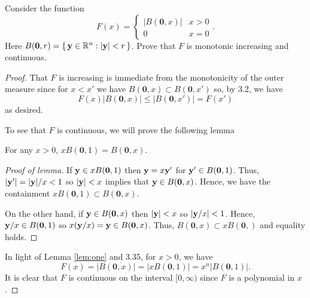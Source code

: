 \begin{problem}
Consider the function
\[
F(x)=
\begin{cases}
|B(\mathbf{0},x)|&x>0\\
0&x=0
\end{cases}.
\]
Here
$B(\mathbf{0},r)=\left\{\,\mathbf{y}\in\mathbb{R}^n:|\mathbf{y}|<r\,\right\}$. Prove
that $F$ is monotonic increasing and continuous.
\end{problem}
\begin{proof}
That $F$ is increasing is immediate from the monotonicity of the outer
measure since for $x<x'$ we have $B(\mathbf{0},x)\subset B(\mathbf{0},x')$
so, by 3.2, we have
\[
F(x)\left|B(\mathbf{0},x)\right|\leq\left|B(\mathbf{0},x')\right|=F(x')
\]
as desired.

To see that $F$ is continuous, we will prove the following lemma
\begin{lemma}
\label{lem:one}
For any $x>0$, $xB(\mathbf{0},1)=B(\mathbf{0},x)$.
\end{lemma}
\begin{proof}[Proof of lemma]
\renewcommand\qedsymbol{$\clubsuit$}
If $\mathbf{y}\in xB(\mathbf{0},1)$ then $\mathbf{y}=x\mathbf{y}'$ for $\mathbf{y}'\in
B(\mathbf{0},1)$. Thus, $|\mathbf{y}'|=|\mathbf{y}|/x<1$ so $|\mathbf{y}|<x$ implies that
$\mathbf{y}\in B(\mathbf{0},x)$. Hence, we have the containment
$xB(\mathbf{0},1)\subset B(\mathbf{0},x)$.

On the other hand, if $\mathbf{y}\in B(\mathbf{0},x)$ then $|\mathbf{y}|<x$ so
$\left|\mathbf{y}/x\right|<1$. Hence, $\mathbf{y}/x\in B(\mathbf{0},1)$ so
$x(\mathbf{y}/x)=\mathbf{y}\in B(\mathbf{0},x)$. Thus, $B(\mathbf{0},x)\subset
xB(\mathbf{0},)$ and equality holds.
\end{proof}
In light of Lemma \ref{lem:one} and 3.35, for $x>0$, we have
\begin{equation}
\label{eq:scale-map}
F(x)=\left|B(\mathbf{0},x)\right|
=\left|xB(\mathbf{0},1)\right|
=x^n\left|B(\mathbf{0},1)\right|.
\end{equation}
It is clear that $F$ is continuous on the interval $[0,\infty)$ since $F$
is a polynomial in $x$.
\end{proof}

